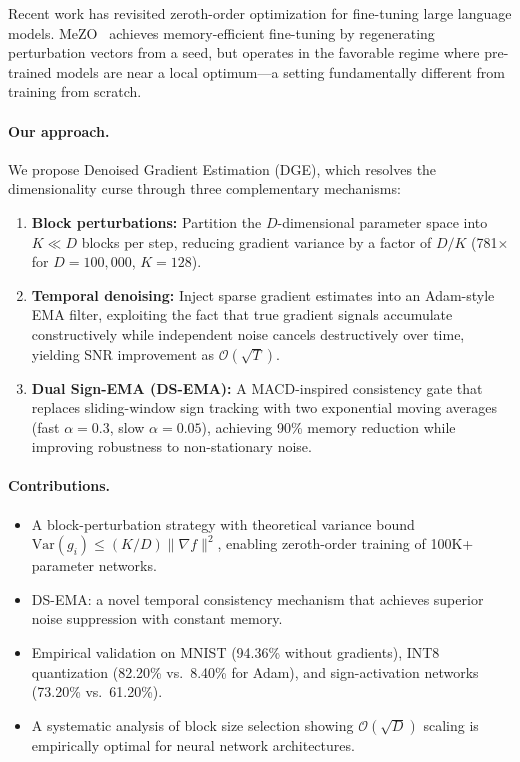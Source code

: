 \documentclass[10pt]{article}
\begin{document}
Recent work has revisited zeroth-order optimization for fine-tuning large language models. MeZO~\citep{malladi2023mezo} achieves memory-efficient fine-tuning by regenerating perturbation vectors from a seed, but operates in the favorable regime where pre-trained models are near a local optimum---a setting fundamentally different from training from scratch.

\paragraph{Our approach.} We propose Denoised Gradient Estimation (DGE), which resolves the dimensionality curse through three complementary mechanisms:

\begin{enumerate}
    \item \textbf{Block perturbations:} Partition the $D$-dimensional parameter space into $K \ll D$ blocks per step, reducing gradient variance by a factor of $D/K$ (781$\times$ for $D{=}100{,}000$, $K{=}128$).
    \item \textbf{Temporal denoising:} Inject sparse gradient estimates into an Adam-style EMA filter, exploiting the fact that true gradient signals accumulate constructively while independent noise cancels destructively over time, yielding SNR improvement as $\mathcal{O}(\sqrt{T})$.
    \item \textbf{Dual Sign-EMA (DS-EMA):} A MACD-inspired consistency gate that replaces sliding-window sign tracking with two exponential moving averages (fast $\alpha{=}0.3$, slow $\alpha{=}0.05$), achieving 90\% memory reduction while improving robustness to non-stationary noise.
\end{enumerate}

\paragraph{Contributions.}
\begin{itemize}
    \item A block-perturbation strategy with theoretical variance bound $\text{Var}(g_i) \leq (K/D) \|\nabla f\|^2$, enabling zeroth-order training of 100K+ parameter networks.
    \item DS-EMA: a novel temporal consistency mechanism that achieves superior noise suppression with constant memory.
    \item Empirical validation on MNIST (94.36\% without gradients), INT8 quantization (82.20\% vs.\ 8.40\% for Adam), and sign-activation networks (73.20\% vs.\ 61.20\%).
    \item A systematic analysis of block size selection showing $\mathcal{O}(\sqrt{D})$ scaling is empirically optimal for neural network architectures.
\end{itemize}
\end{document}
